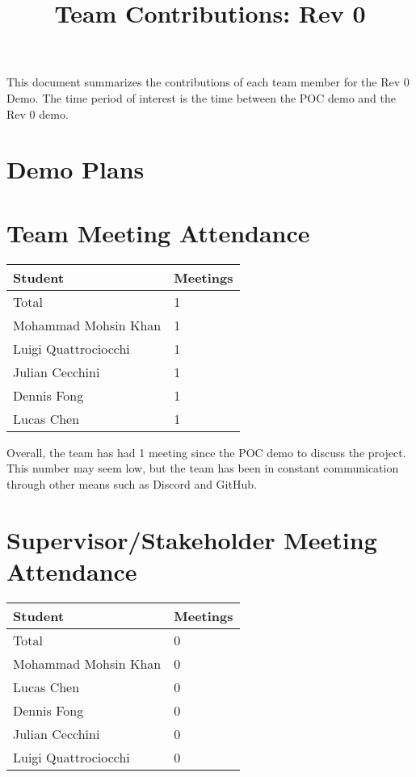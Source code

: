 \documentclass{article}
\title{Team Contributions: Rev 0\\\progname}
\author{\authname}
\date{}
\begin{document}
\maketitle

This document summarizes the contributions of each team member for the Rev 0
Demo.  The time period of interest is the time between the POC demo and the Rev
0 demo.

\section{Demo Plans}


\section{Team Meeting Attendance}

\begin{table}[H]
\centering
\begin{tabular}{ll}
\toprule
\textbf{Student} & \textbf{Meetings}\\
\midrule
Total & 1\\
Mohammad Mohsin Khan & 1\\
Luigi Quattrociocchi & 1\\
Julian Cecchini & 1\\
Dennis Fong & 1\\
Lucas Chen & 1\\
\bottomrule
\end{tabular}
\end{table}

Overall, the team has had 1 meeting since the POC demo to discuss the project. This number may seem low, but the team has been in constant communication through other means such as Discord and GitHub.

\section{Supervisor/Stakeholder Meeting Attendance}

\begin{table}[H]
\centering
\begin{tabular}{ll}
\toprule
\textbf{Student} & \textbf{Meetings}\\
\midrule
Total & 0\\
Mohammad Mohsin Khan & 0\\
Lucas Chen & 0\\
Dennis Fong & 0\\
Julian Cecchini & 0\\
Luigi Quattrociocchi & 0\\
\bottomrule
\end{tabular}
\end{table}
\end{document}
